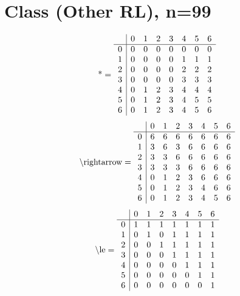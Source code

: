 \documentclass[11pt]{article}
\begin{document}
\section{Class (Other RL), n=99}
\[\text{*} = 
\begin{array}{r | r r r r r r r}
 & 0 & 1 & 2 & 3 & 4 & 5 & 6 \\ \hline
0 & 0 & 0 & 0 & 0 & 0 & 0 & 0 \\
1 & 0 & 0 & 0 & 0 & 1 & 1 & 1 \\
2 & 0 & 0 & 0 & 0 & 2 & 2 & 2 \\
3 & 0 & 0 & 0 & 0 & 3 & 3 & 3 \\
4 & 0 & 1 & 2 & 3 & 4 & 4 & 4 \\
5 & 0 & 1 & 2 & 3 & 4 & 5 & 5 \\
6 & 0 & 1 & 2 & 3 & 4 & 5 & 6 \\
\end{array}
\]
\[\text{\textbackslash rightarrow} = 
\begin{array}{r | r r r r r r r}
 & 0 & 1 & 2 & 3 & 4 & 5 & 6 \\ \hline
0 & 6 & 6 & 6 & 6 & 6 & 6 & 6 \\
1 & 3 & 6 & 3 & 6 & 6 & 6 & 6 \\
2 & 3 & 3 & 6 & 6 & 6 & 6 & 6 \\
3 & 3 & 3 & 3 & 6 & 6 & 6 & 6 \\
4 & 0 & 1 & 2 & 3 & 6 & 6 & 6 \\
5 & 0 & 1 & 2 & 3 & 4 & 6 & 6 \\
6 & 0 & 1 & 2 & 3 & 4 & 5 & 6 \\
\end{array}
\]
\[\text{\textbackslash le} = 
\begin{array}{r | r r r r r r r}
 & 0 & 1 & 2 & 3 & 4 & 5 & 6 \\ \hline
0 & 1 & 1 & 1 & 1 & 1 & 1 & 1 \\
1 & 0 & 1 & 0 & 1 & 1 & 1 & 1 \\
2 & 0 & 0 & 1 & 1 & 1 & 1 & 1 \\
3 & 0 & 0 & 0 & 1 & 1 & 1 & 1 \\
4 & 0 & 0 & 0 & 0 & 1 & 1 & 1 \\
5 & 0 & 0 & 0 & 0 & 0 & 1 & 1 \\
6 & 0 & 0 & 0 & 0 & 0 & 0 & 1 \\
\end{array}
\]
\end{document}
